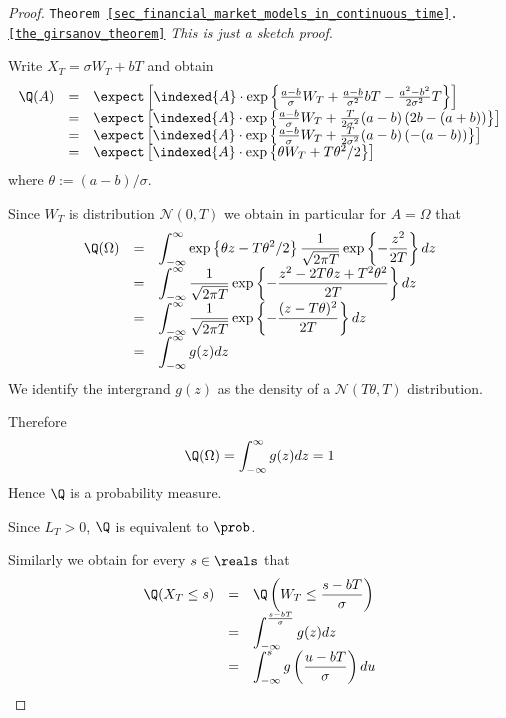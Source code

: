 \documentclass[11pt,a4paper]{article}
\begin{document}
  \begin{proof}{\texttt{Theorem \ref{sec_financial_market_models_in_continuous_time}.\ref{the_girsanov_theorem}}}
    \textit{This is just a sketch proof}.
    \par Write $X_T=\sigma W_T+bT$ and obtain
    \[\begin{array}{rcl}
      \Q(A)&=&\expect\left[\indexed\{A\}\cdot\exp\left\{\frac{a-b}\sigma W_T+\frac{a-b}{\sigma^2}bT-\frac{a^2-b^2}{2\sigma^2}T\right\}\right]\\
      &=&\expect\left[\indexed\{A\}\cdot\exp\left\{\frac{a-b}\sigma W_T+\frac{T}{2\sigma^2}(a-b)\left(2b-(a+b)\right)\right\}\right]\\
      &=&\expect\left[\indexed\{A\}\cdot\exp\left\{\frac{a-b}\sigma W_T+\frac{T}{2\sigma^2}(a-b)\left(-(a-b)\right)\right\}\right]\\
      &=&\expect\left[\indexed\{A\}\cdot\exp\left\{\theta W_T+T\theta^2/2\right\}\right]
    \end{array}\]
    where $\theta:=(a-b)/\sigma$.
    \par Since $W_T$ is distribution $\mathcal{N}(0,T)$ we obtain in particular for $A=\Omega$ that
    \[\everymath={\displaystyle}\begin{array}{rcl}
      \Q(\Omega)&=&\int_{-\infty}^\infty\exp\left\{\theta z-T\theta^2/2\right\}\frac1{\sqrt{2\pi T}}\exp\left\{-\frac{z^2}{2T}\right\}dz\\
      &=&\int_{-\infty}^\infty\frac1{\sqrt{2\pi T}}\exp\left\{-\frac{z^2-2T\theta z+T^2\theta^2}{2T}\right\}dz\\
      &=&\int_{-\infty}^\infty\frac1{\sqrt{2\pi T}}\exp\left\{-\frac{(z-T\theta)^2}{2T}\right\}dz\\
      &=&\int_{-\infty}^\infty g(z)dz
    \end{array}\]
    We identify the intergrand $g(z)$ as the density of a $\mathcal{N}(T\theta,T)$ distribution.
    \par Therefore
    \[ \Q(\Omega)=\int_{-\infty}^\infty g(z)dz=1 \]
    Hence $\Q$ is a probability measure.
    \par Since $L_T>0$, $\Q$ is equivalent to $\prob$.
    \par Similarly we obtain for every $s\in\reals$ that
    \[\everymath={\displaystyle}\begin{array}{rcl}
      \Q(X_T\leq s)&=&\Q\left(W_T\leq \frac{s-bT}\sigma\right)\\
      &=&\int_{-\infty}^{\frac{s-bT}\sigma}g(z)dz\\
      &=&\int_{-\infty}^sg\left(\frac{u-bT}\sigma\right)du

\end{array}\]
\end{proof}
\end{document}
